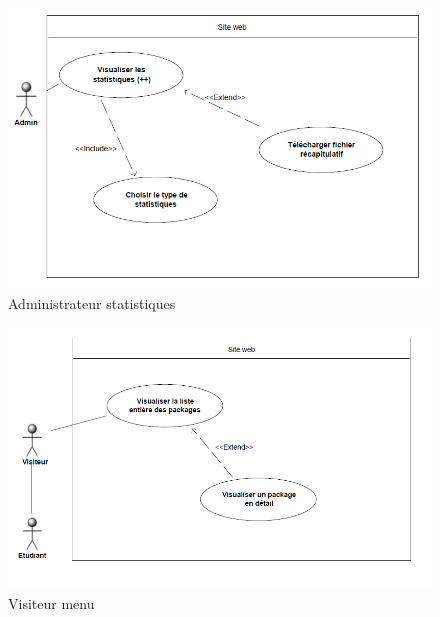     \begin{figure}[h]
        \begin{center}
            \includegraphics[scale=0.70]{images/uml/adminStats.png} 
        \end{center}

        \caption{Administrateur statistiques}
        \label{Administrateur statistiques}
    \end{figure}

    \begin{figure}[h]
        \begin{center}
            \includegraphics[scale=0.70]{images/uml/visiteurMenu.png} 
        \end{center}

        \caption{Visiteur menu}
        \label{Visiteur menu}
    \end{figure}

